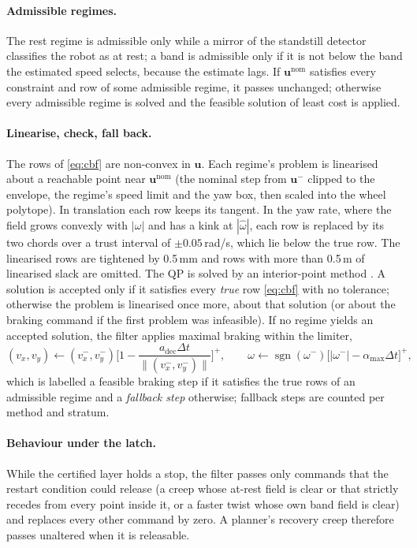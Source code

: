 \documentclass[11pt]{article}
\theoremstyle{definition}
\begin{document}
\paragraph{Admissible regimes.} The rest regime is admissible only while a mirror of the standstill
detector classifies the robot as at rest; a band is admissible only if it is not below the band the
estimated speed selects, because the estimate lags. If $\mathbf{u}^{\mathrm{nom}}$ satisfies every
constraint and row of some admissible regime, it passes unchanged; otherwise every admissible regime is
solved and the feasible solution of least cost is applied.

\paragraph{Linearise, check, fall back.} The rows of \eqref{eq:cbf} are non-convex in $\mathbf{u}$. Each
regime's problem is linearised about a reachable point near $\mathbf{u}^{\mathrm{nom}}$ (the nominal step
from $\mathbf{u}^-$ clipped to the envelope, the regime's speed limit and the yaw box, then scaled into the
wheel polytope). In translation each row keeps its tangent. In the yaw rate, where the field grows
convexly with $|\omega|$ and has a kink at $|\hat\omega|$, each row is replaced by its two chords over a
trust interval of $\pm0.05$\,rad/s, which lie below the true row. The linearised rows are tightened by
0.5\,mm and rows with more than 0.5\,m of linearised slack are omitted. The QP is solved by an
interior-point method \citep{goulart2024clarabel}. A solution is accepted only if it satisfies every
\emph{true} row \eqref{eq:cbf} with no tolerance; otherwise the problem is linearised once more, about
that solution (or about the braking command if the first problem was infeasible). If no regime yields an
accepted solution, the filter applies maximal braking within the limiter,
\begin{equation}
(v_x,v_y)\leftarrow(v^-_x,v^-_y)\Big[1-\frac{a_{\mathrm{dec}}\Delta t}{\|(v^-_x,v^-_y)\|}\Big]^+,\qquad
\omega\leftarrow\operatorname{sgn}(\omega^-)\big[|\omega^-|-\alpha_{\max}\Delta t\big]^+,
\label{eq:fallback}
\end{equation}
which is labelled a feasible braking step if it satisfies the true rows of an admissible regime and a
\emph{fallback step} otherwise; fallback steps are counted per method and stratum.

\paragraph{Behaviour under the latch.} While the certified layer holds a stop, the filter passes only
commands that the restart condition could release (a creep whose at-rest field is clear or that strictly
recedes from every point inside it, or a faster twist whose own band field is clear) and replaces every
other command by zero. A planner's recovery creep therefore passes unaltered when it is releasable.
\end{document}
